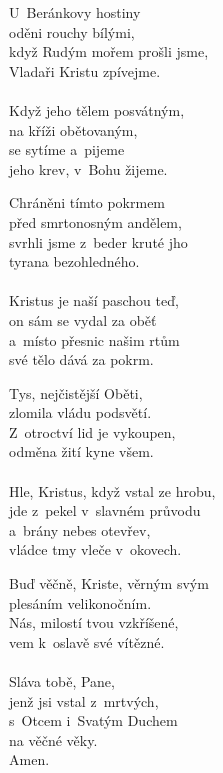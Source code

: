\begin{translatioMulticol}{4}
U~Beránkovy hostiny\\
oděni rouchy bílými,\\
když Rudým mořem prošli jsme,\\
Vladaři Kristu zpívejme.\\
\\
Když jeho tělem posvátným,\\
na kříži obětovaným,\\
se sytíme a~pijeme\\
jeho krev, v~Bohu žijeme.\columnbreak

Chráněni tímto pokrmem\\
před smrtonosným andělem,\\
svrhli jsme z~beder kruté jho\\
tyrana bezohledného.\\
\\
Kristus je naší paschou teď,\\
on sám se vydal za oběť\\
a~místo přesnic našim rtům\\
své tělo dává za pokrm.\columnbreak

Tys, nejčistější Oběti,\\
zlomila vládu podsvětí.\\
Z~otroctví lid je vykoupen,\\
odměna žití kyne všem.\\
\\
Hle, Kristus, když vstal ze hrobu,\\
jde z~pekel v~slavném průvodu\\
a~brány nebes otevřev,\\
vládce tmy vleče v~okovech.\columnbreak

Buď věčně, Kriste, věrným svým\\
plesáním velikonočním.\\
Nás, milostí tvou vzkříšené,\\
vem k~oslavě své vítězné. \\
\\
Sláva tobě, Pane,\\
jenž jsi vstal z~mrtvých,\\
s~Otcem i~Svatým Duchem\\
na věčné věky.\\
Amen.
\end{translatioMulticol}
